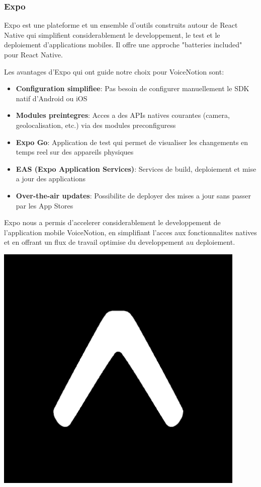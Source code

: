 \subsubsection{Expo}
\begin{minipage}{0.7\textwidth}
Expo est une plateforme et un ensemble d'outils construits autour de React Native qui simplifient considerablement le developpement, le test et le deploiement d'applications mobiles. Il offre une approche "batteries included" pour React Native.

Les avantages d'Expo qui ont guide notre choix pour VoiceNotion sont:

\begin{itemize}
    \item \textbf{Configuration simplifiee}: Pas besoin de configurer manuellement le SDK natif d'Android ou iOS
    \item \textbf{Modules preintegres}: Acces a des APIs natives courantes (camera, geolocalisation, etc.) via des modules preconfiguress
    \item \textbf{Expo Go}: Application de test qui permet de visualiser les changements en temps reel sur des appareils physiques
    \item \textbf{EAS (Expo Application Services)}: Services de build, deploiement et mise a jour des applications
    \item \textbf{Over-the-air updates}: Possibilite de deployer des mises a jour sans passer par les App Stores
\end{itemize}

Expo nous a permis d'accelerer considerablement le developpement de l'application mobile VoiceNotion, en simplifiant l'acces aux fonctionnalites natives et en offrant un flux de travail optimise du developpement au deploiement.
\end{minipage}%
\hfill
\begin{minipage}{0.25\textwidth}
\centering
\includegraphics[width=0.9\textwidth]{assets/docs/logo_expo.png}
\end{minipage}
